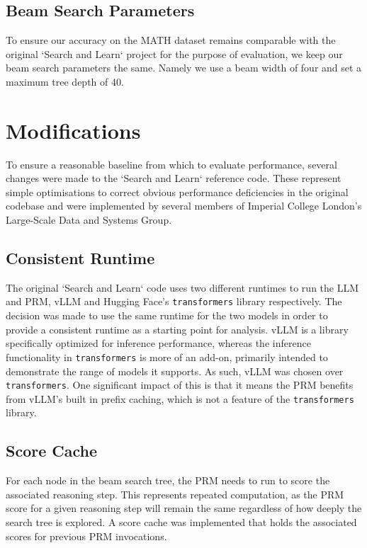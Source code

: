 \documentclass[12pt,twoside]{report}
\begin{document}
\subsection{Beam Search Parameters}
To ensure our accuracy on the MATH dataset remains comparable with the original `Search and Learn` project for the purpose of evaluation, we keep our beam search parameters the same.
Namely we use a beam width of four and set a maximum tree depth of 40.

\section{Modifications}
To ensure a reasonable baseline from which to evaluate performance, several changes were made to the `Search and Learn` reference code.
These represent simple optimisations to correct obvious performance deficiencies in the original codebase and were implemented by several members of Imperial College London's Large-Scale Data and Systems Group.

\subsection{Consistent Runtime} 
The original `Search and Learn` code uses two different runtimes to run the LLM and PRM, vLLM and Hugging Face's \texttt{transformers} library \cite{kwon2023efficient} \cite{wolf2019huggingface} respectively.
The decision was made to use the same runtime for the two models in order to provide a consistent runtime as a starting point for analysis.
vLLM is a library specifically optimized for inference performance, whereas the inference functionality in \texttt{transformers} is more of an add-on, primarily intended to demonstrate the range of models it supports.
As such, vLLM was chosen over \texttt{transformers}.
One significant impact of this is that it means the PRM benefits from vLLM's built in prefix caching, which is not a feature of the \texttt{transformers} library.

\subsection{Score Cache}
For each node in the beam search tree, the PRM needs to run to score the associated reasoning step.
This represents repeated computation, as the PRM score for a given reasoning step will remain the same regardless of how deeply the search tree is explored.
A score cache was implemented that holds the associated scores for previous PRM invocations.
\end{document}
